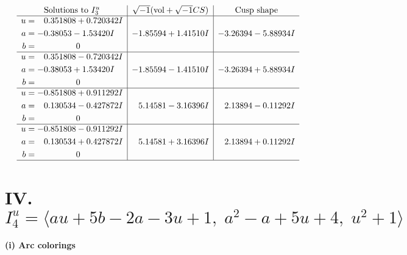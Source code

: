 \documentclass[1p]{elsarticle_modified}
\theoremstyle{definition}
\newcommand{\I}{\sqrt{-1}}
\begin{document}
$$\begin{array}{c|c|c}  
\text{Solutions to }I^u_{3}& \I (\text{vol} + \sqrt{-1}CS) & \text{Cusp shape}\\
 \hline 
\begin{aligned}
u &= \phantom{-}0.351808 + 0.720342 I \\
a &= -0.38053 - 1.53420 I \\
b &= \phantom{-0.000000 } 0\end{aligned}
 & -1.85594 + 1.41510 I & -3.26394 - 5.88934 I \\ \hline\begin{aligned}
u &= \phantom{-}0.351808 - 0.720342 I \\
a &= -0.38053 + 1.53420 I \\
b &= \phantom{-0.000000 } 0\end{aligned}
 & -1.85594 - 1.41510 I & -3.26394 + 5.88934 I \\ \hline\begin{aligned}
u &= -0.851808 + 0.911292 I \\
a &= \phantom{-}0.130534 - 0.427872 I \\
b &= \phantom{-0.000000 } 0\end{aligned}
 & \phantom{-}5.14581 - 3.16396 I & \phantom{-}2.13894 - 0.11292 I \\ \hline\begin{aligned}
u &= -0.851808 - 0.911292 I \\
a &= \phantom{-}0.130534 + 0.427872 I \\
b &= \phantom{-0.000000 } 0\end{aligned}
 & \phantom{-}5.14581 + 3.16396 I & \phantom{-}2.13894 + 0.11292 I\\
 \hline 
 \end{array}$$\newpage\newpage\renewcommand{\arraystretch}{1}
\centering \section*{IV. $I^u_{4}= \langle a u+5 b-2 a-3 u+1,\;a^2- a+5 u+4,\;u^2+1 \rangle$}
\flushleft \textbf{(i) Arc colorings}\\
\end{document}
